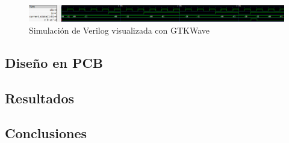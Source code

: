 \begin{figure}[H]
    \centering
    \includegraphics[scale=0.4]{../EJ2/Recursos/simulacion.png}    
    \caption{Simulaci\'on de Verilog visualizada con GTKWave}
    \label{fig:ej2_simulacion}
\end{figure}

\subsection{Dise\~no en PCB}
\subsection{Resultados}

\subsection{Conclusiones}

